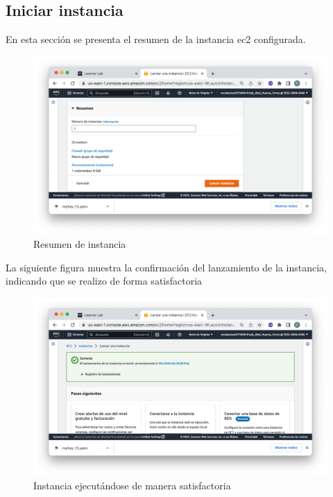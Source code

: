\clearpage

\subsection{Iniciar instancia}
En esta sección se presenta el resumen de la instancia ec2 configurada. 
\begin{figure}[h]
	\centering
	\includegraphics[scale=.35] {img/06}
	\caption{Resumen de instancia}
	\label{fig:6}	
\end{figure} 

La siguiente figura muestra la confirmación del lanzamiento de la instancia, indicando que se realizo de forma satisfactoria 
\begin{figure}[h]
	\centering
	\includegraphics[scale=.35] {img/07}
	\caption{Instancia ejecutándose de manera satisfactoria}
	\label{fig:7}	
\end{figure} 

\clearpage

